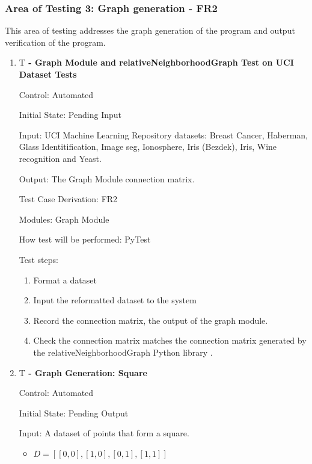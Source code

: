 \documentclass[12pt, titlepage]{article}
\newcounter{testnum} %
\begin{document}
\subsubsection{Area of Testing 3: Graph generation - FR2}
This area of testing addresses the graph generation of the program and output verification of the program.

\begin{enumerate}

\item{T\thetestnum \textbf{\label{T:pythonRNG} 
 - Graph Module and relativeNeighborhoodGraph Test on UCI Dataset Tests}}

Control: Automated
					
Initial State: Pending Input
					
Input: UCI Machine Learning Repository datasets: Breast Cancer, Haberman, Glass Identitification, Image seg, Ionosphere, Iris (Bezdek), Iris, Wine recognition and Yeast.
					
Output: The Graph Module connection matrix.

Test Case Derivation: FR2

Modules: Graph Module
					
How test will be performed: PyTest

Test steps:
\begin{enumerate}
\item Format a dataset
\item Input the reformatted dataset to the system
\item Record the connection matrix, the output of the graph module.
\item Check the connection matrix matches the connection matrix generated by the
relativeNeighborhoodGraph Python library \cite{pythonRNG}.

\end{enumerate}

\item{T\thetestnum \textbf{\label{T:out big} 
 - Graph Generation: Square}}

Control: Automated
					
Initial State: Pending Output
					
Input: A dataset of points that form a square.
\begin{itemize}
    \item $D = [[0, 0], [1, 0], [0, 1], [1, 1]]$
\end{itemize}


\end{enumerate}
\end{document}
